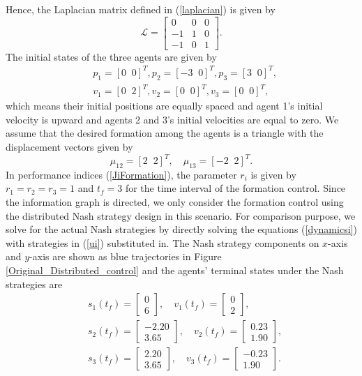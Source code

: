 \documentclass[10pt,doublecolumn]{IEEEtran}  %
\begin{document}
Hence, the Laplacian matrix defined in (\ref{laplacian}) is given by
\[\mathcal{L}=\begin{bmatrix}
0&0&0\\
-1&1&0\\
-1&0&1
\end{bmatrix}.\]
The initial states of the three agents are given by
{\begin{align*}
&p_1=[0\;\;0]^T, p_2=[-3\;\;0]^T,p_3=[3\;\;0]^T,\\
&v_1=[0\;\;2]^T,v_2=[0\;\;0]^T,v_3=[0\;\;0]^T,
\end{align*}}
which means their initial positions are equally spaced and agent 1's initial velocity is upward and agents 2 and 3's initial velocities are equal to zero. We assume that the desired formation among the agents is a triangle with the displacement vectors given by
\[\mu_{12}=[2\;\; 2]^T,\quad \mu_{13}=[-2\;\; 2]^T.\]
In performance indices (\ref{JiFormation}), the parameter $r_i$ is given by $r_1=r_2=r_3=1$ and $t_f=3$ for the time interval of the formation control. Since the information graph is directed, we only consider the formation control using the distributed Nash strategy design in this scenario. For comparison purpose, we solve for the actual Nash strategies by directly solving the equations (\ref{dynamicsi}) with strategies in (\ref{ui}) substituted in. The Nash strategy components on $x$-axis and $y$-axis are shown as blue trajectories in Figure \ref{Original_Distributed_control} and the agents' terminal states under the Nash strategies are
\begin{align*}
&s_1(t_f)=\begin{bmatrix}
0\\
6
\end{bmatrix},\quad
v_1(t_f)=\begin{bmatrix}
0\\
2
\end{bmatrix},\\
&s_2(t_f)=\begin{bmatrix}
-2.20\\
    3.65
    \end{bmatrix},\quad
    v_2(t_f)=\begin{bmatrix}
0.23\\
    1.90
\end{bmatrix},\\
&s_3(t_f)=\begin{bmatrix}
 2.20\\
    3.65
    \end{bmatrix},\quad
    v_3(t_f)=\begin{bmatrix}
-0.23\\
    1.90
\end{bmatrix}.\end{align*}
\end{document}
